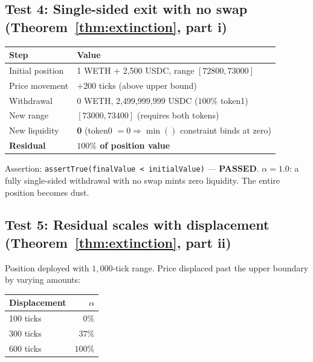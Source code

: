 \documentclass[11pt,a4paper]{article}
\begin{document}
\subsection{Test 4: Single-sided exit with no swap (Theorem~\ref{thm:extinction}, part i)}\label{sec:foundry-mock-extinction}

\begin{table}[H]
\centering
\begin{tabular}{@{}ll@{}}
\toprule
Step & Value \\
\midrule
Initial position & 1 WETH $+$ 2{,}500 USDC, range $[72800, 73000]$ \\
Price movement   & $+200$ ticks (above upper bound) \\
Withdrawal       & 0 WETH, 2{,}499{,}999{,}999 USDC ($100\%$ token1) \\
New range        & $[73000, 73400]$ (requires both tokens) \\
New liquidity    & \textbf{0} (token0 $= 0 \Rightarrow \min()$ constraint binds at zero) \\
\textbf{Residual} & \textbf{$100\%$ of position value} \\
\bottomrule
\end{tabular}
\end{table}

Assertion: \texttt{assertTrue(finalValue < initialValue)} --- \textbf{PASSED}. $\alpha = 1.0$: a fully single-sided withdrawal with no swap mints zero liquidity. The entire position becomes dust.

\subsection{Test 5: Residual scales with displacement (Theorem~\ref{thm:extinction}, part ii)}\label{sec:foundry-displacement}

Position deployed with $1{,}000$-tick range. Price displaced past the upper boundary by varying amounts:

\begin{table}[H]
\centering
\begin{tabular}{@{}lr@{}}
\toprule
Displacement & $\alpha$ \\
\midrule
100 ticks & $0\%$ \\
300 ticks & $37\%$ \\
600 ticks & $100\%$ \\
\bottomrule
\end{tabular}
\end{table}
\end{document}
